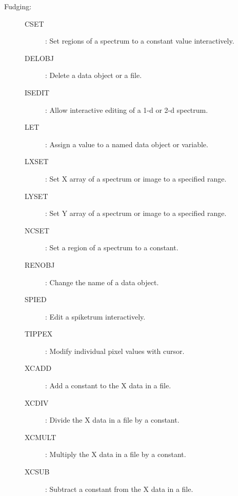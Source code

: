 \begin {description}
\begin{description}
\item [Fudging:]
\begin{description}
\item [CSET]: Set regions of a spectrum to a constant value interactively.
\item [DELOBJ]: Delete a data object or a file.
\item [ISEDIT]: Allow interactive editing of a 1-d or 2-d spectrum.
\item [LET]: Assign a value to a named data object or variable.
\item [LXSET]: Set X array of a spectrum or image to a specified range.
\item [LYSET]: Set Y array of a spectrum or image to a specified range.
\item [NCSET]: Set a region of a spectrum to a constant.
\item [RENOBJ]: Change the name of a data object.
\item [SPIED]: Edit a spiketrum interactively.
\item [TIPPEX]: Modify individual pixel values with cursor.
\item [XCADD]: Add a constant to the X data in a file.
\item [XCDIV]: Divide the X data in a file by a constant.
\item [XCMULT]: Multiply the X data in a file by a constant.
\item [XCSUB]: Subtract a constant from the X data in a file.
\end{description}


\end{description}
\end{description}
